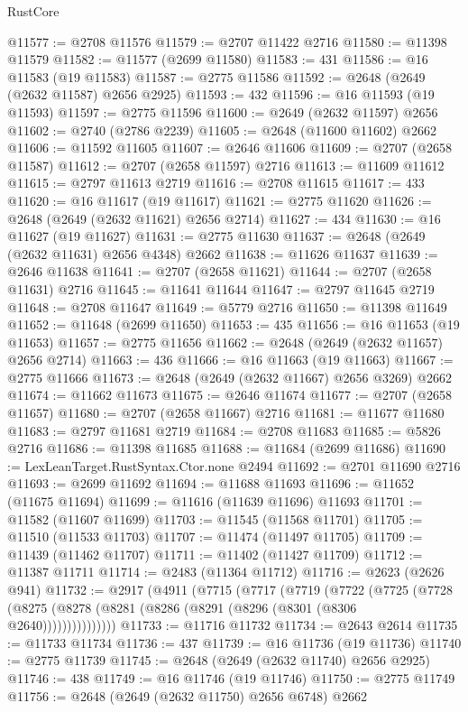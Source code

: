 \begin{lexlean}{RustCore}
\begin{coremodule}
@11577 := @2708 @11576
@11579 := @2707 @11422 @2716
@11580 := @11398 @11579
@11582 := @11577 (@2699 @11580)
@11583 := 431
@11586 := @16 @11583 (@19 @11583)
@11587 := @2775 @11586
@11592 := @2648 (@2649 (@2632 @11587) @2656 @2925)
@11593 := 432
@11596 := @16 @11593 (@19 @11593)
@11597 := @2775 @11596
@11600 := @2649 (@2632 @11597) @2656
@11602 := @2740 (@2786 @2239)
@11605 := @2648 (@11600 @11602) @2662
@11606 := @11592 @11605
@11607 := @2646 @11606
@11609 := @2707 (@2658 @11587)
@11612 := @2707 (@2658 @11597) @2716
@11613 := @11609 @11612
@11615 := @2797 @11613 @2719
@11616 := @2708 @11615
@11617 := 433
@11620 := @16 @11617 (@19 @11617)
@11621 := @2775 @11620
@11626 := @2648 (@2649 (@2632 @11621) @2656 @2714)
@11627 := 434
@11630 := @16 @11627 (@19 @11627)
@11631 := @2775 @11630
@11637 := @2648 (@2649 (@2632 @11631) @2656 @4348) @2662
@11638 := @11626 @11637
@11639 := @2646 @11638
@11641 := @2707 (@2658 @11621)
@11644 := @2707 (@2658 @11631) @2716
@11645 := @11641 @11644
@11647 := @2797 @11645 @2719
@11648 := @2708 @11647
@11649 := @5779 @2716
@11650 := @11398 @11649
@11652 := @11648 (@2699 @11650)
@11653 := 435
@11656 := @16 @11653 (@19 @11653)
@11657 := @2775 @11656
@11662 := @2648 (@2649 (@2632 @11657) @2656 @2714)
@11663 := 436
@11666 := @16 @11663 (@19 @11663)
@11667 := @2775 @11666
@11673 := @2648 (@2649 (@2632 @11667) @2656 @3269) @2662
@11674 := @11662 @11673
@11675 := @2646 @11674
@11677 := @2707 (@2658 @11657)
@11680 := @2707 (@2658 @11667) @2716
@11681 := @11677 @11680
@11683 := @2797 @11681 @2719
@11684 := @2708 @11683
@11685 := @5826 @2716
@11686 := @11398 @11685
@11688 := @11684 (@2699 @11686)
@11690 := LexLeanTarget.RustSyntax.Ctor.none @2494
@11692 := @2701 @11690 @2716
@11693 := @2699 @11692
@11694 := @11688 @11693
@11696 := @11652 (@11675 @11694)
@11699 := @11616 (@11639 @11696) @11693
@11701 := @11582 (@11607 @11699)
@11703 := @11545 (@11568 @11701)
@11705 := @11510 (@11533 @11703)
@11707 := @11474 (@11497 @11705)
@11709 := @11439 (@11462 @11707)
@11711 := @11402 (@11427 @11709)
@11712 := @11387 @11711
@11714 := @2483 (@11364 @11712)
@11716 := @2623 (@2626 @941)
@11732 := @2917
    (@4911
      (@7715
        (@7717
          (@7719
            (@7722
              (@7725
                (@7728 (@8275 (@8278 (@8281 (@8286 (@8291 (@8296 (@8301 (@8306 @2640)))))))))))))))
@11733 := @11716 @11732
@11734 := @2643 @2614
@11735 := @11733 @11734
@11736 := 437
@11739 := @16 @11736 (@19 @11736)
@11740 := @2775 @11739
@11745 := @2648 (@2649 (@2632 @11740) @2656 @2925)
@11746 := 438
@11749 := @16 @11746 (@19 @11746)
@11750 := @2775 @11749
@11756 := @2648 (@2649 (@2632 @11750) @2656 @6748) @2662

\end{coremodule}
\end{lexlean}
